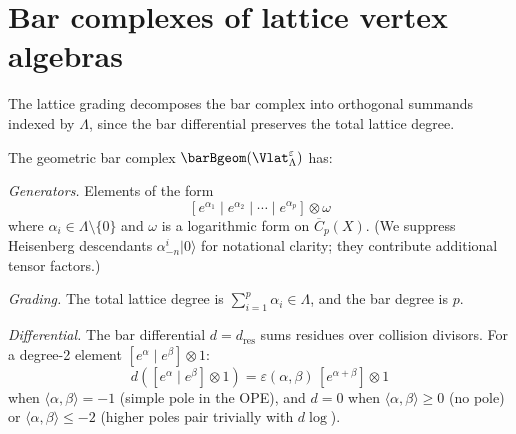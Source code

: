 
\section{Bar complexes of lattice vertex algebras}
\label{sec:lattice:bar}

The lattice grading decomposes the bar complex into orthogonal summands indexed by $\Lambda$, since the bar differential preserves the total lattice degree.

\begin{construction}
\label{constr:lattice:bar-complex}
The geometric bar complex $\barBgeom(\Vlat_\Lambda^\varepsilon)$ has:

\noindent\emph{Generators.} Elements of the form
\[
[e^{\alpha_1} \mid e^{\alpha_2} \mid \cdots \mid e^{\alpha_p}]
\otimes \omega
\]
where $\alpha_i \in \Lambda \setminus \{0\}$ and $\omega$ is a
logarithmic form on $\overline{C}_p(X)$. (We suppress Heisenberg
descendants $\alpha_{-n}^i |0\rangle$ for notational clarity; they
contribute additional tensor factors.)

\noindent\emph{Grading.} The total lattice degree is $\sum_{i=1}^p \alpha_i \in \Lambda$, and the bar degree is $p$.

\noindent\emph{Differential.}
The bar differential $d = d_{\text{res}}$ sums residues over collision
divisors. For a degree-2 element $[e^\alpha \mid e^\beta] \otimes 1$:
\begin{equation}\label{eq:lattice:bar-diff}
d([e^\alpha \mid e^\beta] \otimes 1)
= \varepsilon(\alpha,\beta)\,[e^{\alpha+\beta}] \otimes 1
\end{equation}
when $\langle\alpha,\beta\rangle = -1$ (simple pole in the OPE), and
$d = 0$ when $\langle\alpha,\beta\rangle \geq 0$ (no pole) or
$\langle\alpha,\beta\rangle \leq -2$ (higher poles pair trivially
with $d\log$).
\end{construction}

